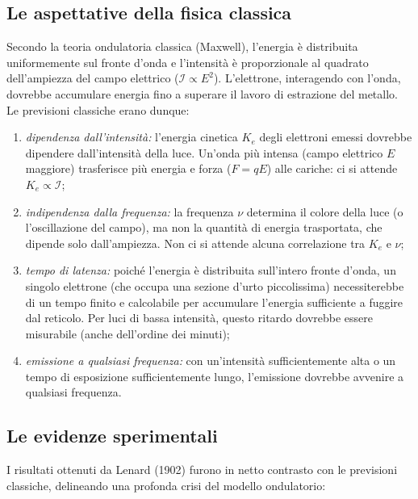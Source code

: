 \documentclass[a4paper,11pt]{report}
\begin{document}
\subsection{Le aspettative della fisica classica}
Secondo la teoria ondulatoria classica (Maxwell), l'energia è distribuita uniformemente sul fronte d'onda e l'intensità è proporzionale al quadrato dell'ampiezza del campo elettrico ($\mathcal{I} \propto E^2$). L'elettrone, interagendo con l'onda, dovrebbe accumulare energia fino a superare il lavoro di estrazione del metallo.
Le previsioni classiche erano dunque:
\begin{enumerate}
    \item \textit{dipendenza dall'intensità:} l'energia cinetica $K_e$ degli elettroni emessi dovrebbe dipendere dall'intensità della luce. Un'onda più intensa (campo elettrico $E$ maggiore) trasferisce più energia e forza ($F = qE$) alle cariche: ci si attende $K_e \propto \mathcal{I}$;
    \item \textit{indipendenza dalla frequenza:} la frequenza $\nu$ determina il colore della luce (o l'oscillazione del campo), ma non la quantità di energia trasportata, che dipende solo dall'ampiezza. Non ci si attende alcuna correlazione tra $K_e$ e $\nu$;
    \item \textit{tempo di latenza:} poiché l'energia è distribuita sull'intero fronte d'onda, un singolo elettrone (che occupa una sezione d'urto piccolissima) necessiterebbe di un tempo finito e calcolabile per accumulare l'energia sufficiente a fuggire dal reticolo. Per luci di bassa intensità, questo ritardo dovrebbe essere misurabile (anche dell'ordine dei minuti);
    \item \textit{emissione a qualsiasi frequenza:} con un'intensità sufficientemente alta o un tempo di esposizione sufficientemente lungo, l'emissione dovrebbe avvenire a qualsiasi frequenza.
\end{enumerate}

\subsection{Le evidenze sperimentali}
I risultati ottenuti da Lenard (1902) furono in netto contrasto con le previsioni classiche, delineando una profonda crisi del modello ondulatorio:
\end{document}
